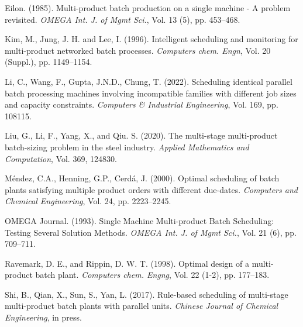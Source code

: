 \documentclass[authoryear,manuscript,12pt]{elsarticle}
\begin{document}




\begin{thebibliography}{1}


Eilon. (1985). Multi-product batch production on a single machine - A problem revisited. {\it OMEGA Int. J. of Mgmt Sci.}, Vol. 13 (5), pp. 453--468.

Kim, M., Jung, J. H. and Lee, I. (1996). Intelligent scheduling and monitoring for multi-product networked batch processes. {\it  Computers chem. Engn}, Vol. 20 (Suppl.), pp. 1149--1154.

Li, C., Wang, F., Gupta, J.N.D., Chung, T. (2022). Scheduling identical parallel batch processing machines involving incompatible families with different job sizes and capacity constraints. {\it Computers \& Industrial Engineering}, Vol. 169, pp. 108115.

Liu, G., Li, F., Yang, X., and Qiu. S. (2020). The multi-stage multi-product batch-sizing problem in the steel industry. {\it  Applied Mathematics and Computation}, Vol. 369, 124830.

Méndez, C.A., Henning, G.P., Cerdá, J. (2000). Optimal scheduling of batch plants satisfying multiple product
orders with different due-dates. {\it Computers and Chemical Engineering}, Vol. 24, pp. 2223--2245.

OMEGA Journal. (1993). Single Machine Multi-product Batch Scheduling: Testing Several Solution Methods. {\it  OMEGA Int. J. of Mgmt Sci.}, Vol. 21 (6), pp. 709--711.

Ravemark, D. E., and Rippin, D. W. T. (1998). Optimal design of a multi-product batch plant. {\it Computers chem. Engng}, Vol. 22 (1-2), pp. 177--183.

Shi, B., Qian, X., Sun, S., Yan, L. (2017). Rule-based scheduling of multi-stage multi-product batch plants with parallel units. {\it Chinese Journal of Chemical Engineering}, in press.

\end{thebibliography}
\end{document}
